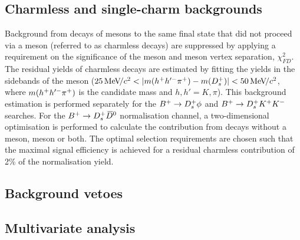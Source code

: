 \subsection{Charmless and single-charm backgrounds}

Background from decays of \Bp mesons to the same final state that did not proceed via a \Dsp meson (referred to as charmless decays) are suppressed by applying a requirement on the significance of the \Bp meson and \Dsp meson vertex separation, $\chi^{2}_{FD}$. 
The residual yields of charmless decays are estimated by fitting the \Bp yields in the sidebands of the \Dsp meson ($25{\mathrm{\,Me\kern -0.1em V\!/}c^2} < |m(h^{+}h'^{-}{{\pi}^+}) - m({{D}^+_{s}})| < 50{\mathrm{\,Me\kern -0.1em V\!/}c^2} $, where $m(h^{+}h'^{-}{{\pi}^+})$ is the \Dsp candidate mass and $h,h'=K,\pi$). This background estimation is performed separately for the ${{{B}^+}} \rightarrow {\ensuremath{{D}^+_{s}}} \phi$ and ${{{B}^+}} \rightarrow {\ensuremath{{D}^+_{s}}} {\ensuremath{{K}^+}} {\ensuremath{{K}^-}}$ searches. For the ${{{B}^+}} \rightarrow {\ensuremath{{D}^+_{s}}} {\ensuremath{{\kern 0.2em\overline{\kern -0.2em D}{}}{}^0}}$ normalisation channel, a two-dimensional optimisation is performed to calculate the contribution from decays without a \Dsp meson, \Dzb meson or both. The optimal selection requirements are chosen such that the maximal signal efficiency is achieved for a residual charmless contribution of 2\% of the normalisation yield.

\subsection{Background vetoes}
\subsection{Multivariate analysis}



